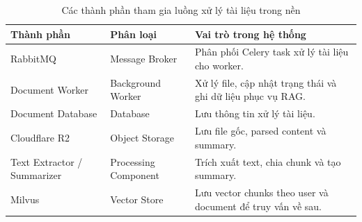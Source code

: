 \begin{table}[H]
\centering
\renewcommand{\arraystretch}{1.3}

\begin{tabular}{|l|l|p{5cm}|}
\hline
\textbf{Thành phần} & \textbf{Phân loại} & \textbf{Vai trò trong hệ thống} \\ \hline
RabbitMQ & Message Broker & Phân phối Celery task xử lý tài liệu cho worker. \\ \hline
Document Worker & Background Worker & Xử lý file, cập nhật trạng thái và ghi dữ liệu phục vụ RAG. \\ \hline
Document Database & Database & Lưu thông tin xử lý tài liệu. \\ \hline
Cloudflare R2 & Object Storage & Lưu file gốc, parsed content và summary. \\ \hline
Text Extractor / Summarizer & Processing Component & Trích xuất text, chia chunk và tạo summary. \\ \hline
Milvus & Vector Store & Lưu vector chunks theo user và document để truy vấn về sau. \\ \hline
\end{tabular}
\caption{Các thành phần tham gia luồng xử lý tài liệu trong nền}
\end{table}

